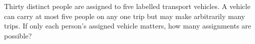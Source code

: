 Thirty distinct people are assigned to five labelled transport vehicles. A vehicle can carry at most five people on any one trip but may make arbitrarily many trips. If only each person's assigned vehicle matters, how many assignments are possible?
